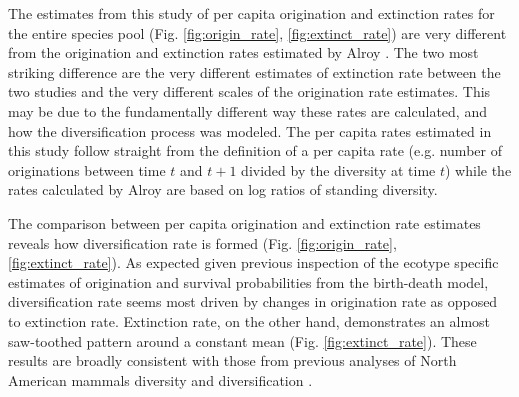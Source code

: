 The estimates from this study of per capita origination and extinction rates for the entire species pool (Fig. \ref{fig:origin_rate}, \ref{fig:extinct_rate}) are very different from the origination and extinction rates estimated by Alroy \citep{Alroy2009}. The two most striking difference are the very different estimates of extinction rate between the two studies and the very different scales of the origination rate estimates. This may be due to the fundamentally different way these rates are calculated, and how the diversification process was modeled. The per capita rates estimated in this study follow straight from the definition of a per capita rate (e.g. number of originations between time \(t\) and \(t + 1\) divided by the diversity at time \(t\)) while the rates calculated by Alroy \citep{Alroy2009} are based on log ratios of standing diversity.

The comparison between per capita origination and extinction rate estimates reveals how diversification rate is formed (Fig. \ref{fig:origin_rate}, \ref{fig:extinct_rate}). As expected given previous inspection of the ecotype specific estimates of origination and survival probabilities from the birth-death model, diversification rate seems most driven by changes in origination rate as opposed to extinction rate. Extinction rate, on the other hand, demonstrates an almost saw-toothed pattern around a constant mean (Fig. \ref{fig:extinct_rate}). These results are broadly consistent with those from previous analyses of North American mammals diversity and diversification \citep{Alroy1996a,Alroy2000g,Alroy2009}.

